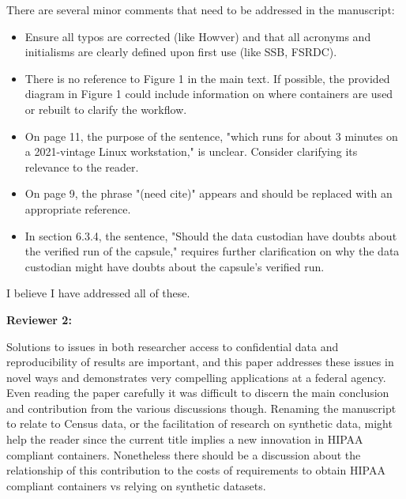\begin{referee}

     There are several minor comments that need to be addressed in the manuscript:
    \begin{itemize}
        \item Ensure all typos are corrected (like Howver) and that all acronyms and initialisms are clearly defined upon first use (like SSB, FSRDC). 
        \item There is no reference to Figure 1 in the main text. If possible, the provided diagram in Figure 1 could include information on where containers are used or rebuilt to clarify the workflow. 
        \item On page 11, the purpose of the sentence, "which runs for about 3 minutes on a 2021-vintage Linux workstation," is unclear.  Consider clarifying its relevance to the reader. 
        \item On page 9, the phrase "(need cite)" appears and should be replaced with an appropriate reference. 
         \item In section 6.3.4, the sentence, "Should the data custodian have doubts about the verified run of the capsule," requires further clarification on why the data custodian might have doubts about the capsule's verified run. 
    \end{itemize}

\end{referee}

\begin{response}
    I believe I have addressed all of these.
\end{response}

\textbf{Reviewer 2:}

\begin{referee}
    Solutions to issues in both researcher access to confidential data and reproducibility of
results are important, and this paper addresses these issues in novel ways and demonstrates very
compelling applications at a federal agency. Even reading the paper carefully it was difficult to discern
the main conclusion and contribution from the various discussions though. Renaming the manuscript
to relate to Census data, or the facilitation of research on synthetic data, might help the reader since
the current title implies a new innovation in HIPAA compliant containers. Nonetheless there should be
a discussion about the relationship of this contribution to the costs of requirements to obtain HIPAA
compliant containers vs relying on synthetic datasets. 
\end{referee}

